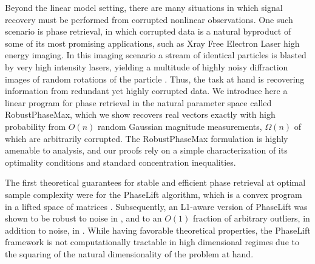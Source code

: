 \documentclass[12pt]{article}
\newcommand{\1}{\mathbbm{1}}
\begin{document}
Beyond the linear model setting, there are many situations in which signal recovery must be performed from corrupted nonlinear observations. One such scenario is phase retrieval, in which corrupted data is a natural byproduct of some of its most promising applications, such as Xray Free Electron Laser high energy imaging.  In this imaging scenario a stream of identical particles is blasted by very high intensity lasers, yielding a multitude of highly noisy diffraction images of random rotations of the particle \cite{xfel1, xfel2}. Thus, the task at hand is recovering information from redundant yet highly corrupted data.  We introduce here a linear program for phase retrieval in the natural parameter space called RobustPhaseMax, which we show recovers real vectors exactly with high probability from $O(n)$ random Gaussian magnitude measurements, $\Omega(n)$ of which are arbitrarily corrupted. The RobustPhaseMax formulation is highly amenable to analysis, and our proofs rely on a simple characterization of its optimality conditions and standard concentration inequalities. 


The first theoretical guarantees for stable and efficient phase retrieval at optimal sample complexity were for the PhaseLift algorithm, which is a convex program in a lifted space of matrices \cite{CL2012, CSV2013}. Subsequently, an L1-aware version of PhaseLift was shown to be robust to noise in \cite{CL2012}, and to an $O(1)$ fraction of arbitrary outliers, in addition to noise, in \cite{phaseliftrobust}. While having favorable theoretical properties, the PhaseLift framework is not computationally tractable in high dimensional regimes due to the squaring of the natural dimensionality of the problem at hand. %
\end{document}
